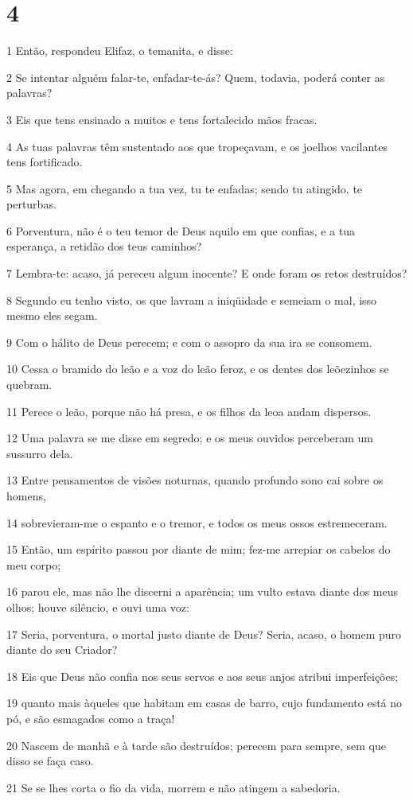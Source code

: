 \chapter{4}

\par 1 Então, respondeu Elifaz, o temanita, e disse:
\par 2 Se intentar alguém falar-te, enfadar-te-ás? Quem, todavia, poderá conter as palavras?
\par 3 Eis que tens ensinado a muitos e tens fortalecido mãos fracas.
\par 4 As tuas palavras têm sustentado aos que tropeçavam, e os joelhos vacilantes tens fortificado.
\par 5 Mas agora, em chegando a tua vez, tu te enfadas; sendo tu atingido, te perturbas.
\par 6 Porventura, não é o teu temor de Deus aquilo em que confias, e a tua esperança, a retidão dos teus caminhos?
\par 7 Lembra-te: acaso, já pereceu algum inocente? E onde foram os retos destruídos?
\par 8 Segundo eu tenho visto, os que lavram a iniqüidade e semeiam o mal, isso mesmo eles segam.
\par 9 Com o hálito de Deus perecem; e com o assopro da sua ira se consomem.
\par 10 Cessa o bramido do leão e a voz do leão feroz, e os dentes dos leõezinhos se quebram.
\par 11 Perece o leão, porque não há presa, e os filhos da leoa andam dispersos.
\par 12 Uma palavra se me disse em segredo; e os meus ouvidos perceberam um sussurro dela.
\par 13 Entre pensamentos de visões noturnas, quando profundo sono cai sobre os homens,
\par 14 sobrevieram-me o espanto e o tremor, e todos os meus ossos estremeceram.
\par 15 Então, um espírito passou por diante de mim; fez-me arrepiar os cabelos do meu corpo;
\par 16 parou ele, mas não lhe discerni a aparência; um vulto estava diante dos meus olhos; houve silêncio, e ouvi uma voz:
\par 17 Seria, porventura, o mortal justo diante de Deus? Seria, acaso, o homem puro diante do seu Criador?
\par 18 Eis que Deus não confia nos seus servos e aos seus anjos atribui imperfeições;
\par 19 quanto mais àqueles que habitam em casas de barro, cujo fundamento está no pó, e são esmagados como a traça!
\par 20 Nascem de manhã e à tarde são destruídos; perecem para sempre, sem que disso se faça caso.
\par 21 Se se lhes corta o fio da vida, morrem e não atingem a sabedoria.

